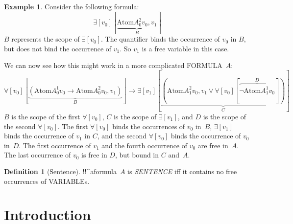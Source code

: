 \documentclass[10pt,a4paper]{article}
\newcommand*{\olup}[1]{\MakeUppercase{#1}}
\theoremstyle{plain}
\theoremstyle{definition}
\newtheorem{defn}[thm]{Definition}
\newtheorem{ex}[thm]{Example}
\theoremstyle{remark}
\newcommand*{\olfileid}[3]{}
\newcommand*{\olsection}[1]{\section*{#1}}
\providecommand{\lif}{\mathbin{\rightarrow}}
\providecommand{\lforall}{\mathord{\forall}}
\providecommand{\lexists}{\mathord{\exists}}
\providecommand{\Obj}{}
\providecommand{\Atom}{\mathrm{Atom}}
\begin{document}
\begin{ex}
Consider the following formula:
\[
\lexists[\Obj v_0][\underbrace{\Atom{\Obj A^2_0}{\Obj v_0,\Obj v_1}}_{B}] 
\]
$B$ represents the scope of $\lexists[\Obj v_0]$. 
The quantifier binds the occurrence of $\Obj v_0$ in $B$, but
does not bind the occurrence of $\Obj v_1$. So $\Obj v_1$ is
a free variable in this case.


We can now see how this might work in a more complicated 
\olup{formula}~$A$:
\[
\lforall[\Obj v_0][\underbrace{(\Atom{\Obj A^1_0}{\Obj v_0} \lif
    \Atom{\Obj A^2_0}{\Obj v_0, \Obj v_1})}_{B}] \lif \lexists[\Obj
  v_1][\underbrace{(\Atom{\Obj A^2_1}{\Obj v_0, \Obj v_1} \lor \lforall[\Obj v_0][\overbrace{\lnot \Atom{\Obj A^1_1}{\Obj v_0}}^{D}])}_{C}]
\]
$B$ is the scope of the first $\lforall[\Obj v_0]$, $C$ is the scope
of $\lexists[\Obj v_1]$, and $D$ is the scope of the second
$\lforall[\Obj v_0]$.  The first $\lforall[\Obj v_0]$ binds the
occurrences of $\Obj v_0$ in~$B$, $\lexists[\Obj v_1]$ binds the occurrence
of $\Obj v_1$ in $C$, and the second $\lforall[\Obj v_0]$ binds the
occurrence of $\Obj v_0$ in~$D$.  The first occurrence of $\Obj v_1$
and the fourth occurrence of $\Obj v_0$ are free in~$A$. The last
occurrence of $\Obj v_0$ is free in $D$, but bound in $C$ and~$A$.
\end{ex}

\begin{defn}[Sentence]
!!^a{formula}~$A$ is  \emph{\olup{sentence}} iff it
contains no free occurrences of \olup{variable}s.
\end{defn}






\olfileid{fol}{syn}{its}

\olsection{Introduction}
\end{document}
